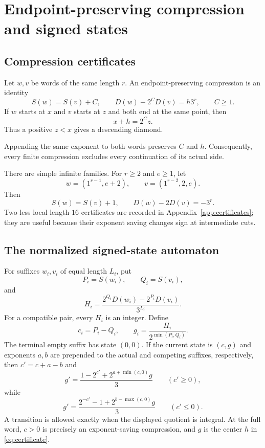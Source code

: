 \documentclass[11pt,reqno]{amsart}
\numberwithin{equation}{section}
\theoremstyle{definition}
\theoremstyle{remark}
\begin{document}
\section{Endpoint-preserving compression and signed states}\label{sec:signedstates}

\subsection{Compression certificates}

Let $w,v$ be words of the same length $r$.  An endpoint-preserving compression is an identity
\begin{equation}\label{eq:certificate}
 S(w)=S(v)+C,
 \qquad
 D(w)-2^C D(v)=h3^r,
 \qquad C\ge1.
\end{equation}
If $w$ starts at $x$ and $v$ starts at $z$ and both end at the same point, then
\begin{equation}\label{eq:center}
 x+h=2^Cz.
\end{equation}
Thus a positive $z<x$ gives a descending diamond.

Appending the same exponent to both words preserves $C$ and $h$.  Consequently, every finite compression excludes every continuation of its actual side.

There are simple infinite families.  For $r\ge2$ and $e\ge1$, let
\[
 w=(1^{r-1},e+2),
 \qquad
 v=(1^{r-2},2,e).
\]
Then
\begin{equation}\label{eq:onescarry}
 S(w)=S(v)+1,
 \qquad
 D(w)-2D(v)=-3^r.
\end{equation}
Two less local length-$16$ certificates are recorded in Appendix~\ref{app:certificates}; they are useful because their exponent saving changes sign at intermediate cuts.

\subsection{The normalized signed-state automaton}

For suffixes $w_i,v_i$ of equal length $L_i$, put
\[
 P_i=S(w_i),
 \qquad
 Q_i=S(v_i),
\]
and
\begin{equation}\label{eq:Hsigned}
 H_i=
 \frac{2^{Q_i}D(w_i)-2^{P_i}D(v_i)}{3^{L_i}}.
\end{equation}
For a compatible pair, every $H_i$ is an integer.  Define
\[
 c_i=P_i-Q_i,
 \qquad
 g_i=\frac{H_i}{2^{\min(P_i,Q_i)}}.
\]
The terminal empty suffix has state $(0,0)$.  If the current state is $(c,g)$ and exponents $a,b$ are prepended to the actual and competing suffixes, respectively, then $c'=c+a-b$ and
\begin{equation}\label{eq:transitionplus}
 g'=
 \frac{1-2^{c'}+2^{a+\min(c,0)}g}{3}
 \qquad(c'\ge0),
\end{equation}
while
\begin{equation}\label{eq:transitionminus}
 g'=
 \frac{2^{-c'}-1+2^{b-\max(c,0)}g}{3}
 \qquad(c'\le0).
\end{equation}
A transition is allowed exactly when the displayed quotient is integral.  At the full word, $c>0$ is precisely an exponent-saving compression, and $g$ is the center $h$ in \eqref{eq:certificate}.
\end{document}
